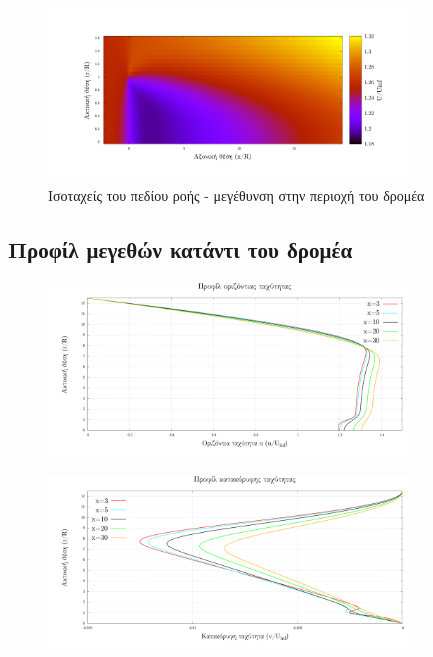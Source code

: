 \begin{figure}[h!]
    \begin{center}
        \includegraphics[width=0.85\textwidth]{figures/isoU_zoom.pdf}
    \end{center}
    \caption{Ισοταχείς του πεδίου ροής - μεγέθυνση στην περιοχή του δρομέα}
    \label{fig:isoU_zoom}
\end{figure}

\subsection{Προφίλ μεγεθών κατάντι του δρομέα}

\begin{figure}[h!]
    \begin{center}
        \includegraphics[width=0.85\textwidth]{figures/u_B.pdf}
    \end{center}
\end{figure}

\begin{figure}[h!]
    \begin{center}
        \includegraphics[width=0.85\textwidth]{figures/v_B.pdf}
    \end{center}
\end{figure}

